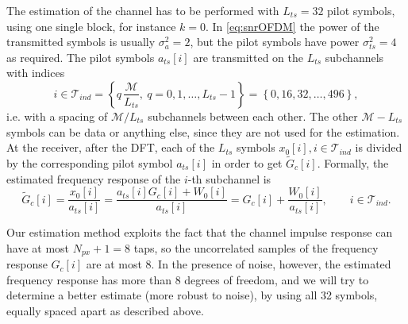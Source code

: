 \documentclass[10pt]{article}
\newcommand{\ofdM} {\mathcal{M}}
\begin{document}
The estimation of the channel has to be performed with $L_{ts} = 32$ pilot symbols, using one single block, for instance $k=0$. In \eqref{eq:snrOFDM} the power of the transmitted symbols is usually $\sigma_a^2 = 2$, but the pilot symbols have power $\sigma_{ts}^2 = 4$ as required. The pilot symbols $a_{ts}[i]$ are transmitted on the $L_{ts}$ subchannels with indices
\begin{equation}
	i \in \mathcal{T}_{ind} = \left\{q \, \frac{\ofdM}{L_{ts}}, \ q = 0, 1, \ldots,L_{ts}-1 \right\}  = \left\{ 0, 16, 32, \dots, 496 \right\},
	\label{eq:OFDMequallyspacedindices}
\end{equation}
i.e. with a spacing of $\ofdM/L_{ts}$ subchannels between each other. The other $\ofdM - L_{ts}$ symbols can be data or anything else, since they are not used for the estimation. At the receiver, after the DFT, each of the $L_{ts}$ symbols $x_0[i], i \in \mathcal{T}_{ind}$ is divided by the corresponding pilot symbol $a_{ts}[i]$ in order to get $\tilde{G}_c[i]$. Formally, the estimated frequency response of the $i$-th subchannel is
\begin{equation}
	\tilde{G}_c[i] = \dfrac{x_0[i]}{a_{ts}[i]} = \dfrac{a_{ts}[i] G_c[i] + W_0[i]}{a_{ts}[i]} = G_c[i] + \dfrac{W_0[i]}{a_{ts}[i]}, \qquad i \in \mathcal{T}_{ind}.
\end{equation}

Our estimation method exploits the fact that the channel impulse response can have at most $N_{px} + 1 = 8$ taps, so the uncorrelated samples of the frequency response $G_c[i]$ are at most 8. In the presence of noise, however, the estimated frequency response has more than 8 degrees of freedom, and we will try to determine a better estimate (more robust to noise), by using all 32 symbols, equally spaced apart as described above.
\end{document}
